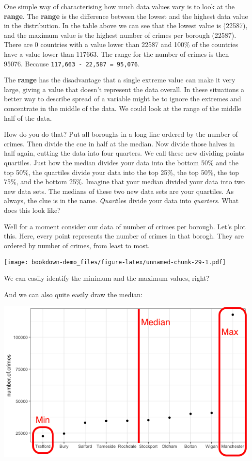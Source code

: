 \documentclass[]{book}
\theoremstyle{definition}
\theoremstyle{definition}
\theoremstyle{definition}
\theoremstyle{remark}
\begin{document}
One simple way of characterising how much data values vary is to look at
the \textbf{range}. The \textbf{range} is the difference between the
lowest and the highest data value in the distribution. In the table
above we can see that the lowest value is (22587), and the maximum value
is the highest number of crimes per borough (22587). There are 0
countries with a value lower than 22587 and 100\% of the countries have
a value lower than 117663. The range for the number of crimes is then
95076. Because \texttt{117,663\ -\ 22,587\ =\ 95,076}.

The \textbf{range} has the disadvantage that a single extreme value can
make it very large, giving a value that doesn't represent the data
overall. In these situations a better way to describe spread of a
variable might be to ignore the extremes and concentrate in the middle
of the data. We could look at the range of the middle half of the data.

How do you do that? Put all boroughs in a long line ordered by the
number of crimes. Then divide the cue in half at the median. Now divide
those halves in half again, cutting the data into four quarters. We call
these new dividing points quartiles. Just how the median divides your
data into the bottom 50\% and the top 50\%, the quartiles divide your
data into the top 25\%, the top 50\%, the top 75\%, and the bottom 25\%.
Imagine that your median divided your data into two new data sets. The
medians of these two new data sets are your quartiles. As always, the
clue is in the name. \emph{Quart}iles divide your data into
\emph{quarters}. What does this look like?

Well for a moment consider our data of number of crimes per borough.
Let's plot this. Here, every point represents the number of crimes in
that borogh. They are ordered by number of crimes, from least to most.

\texttt{[image: bookdown-demo\_files/figure-latex/unnamed-chunk-29-1.pdf]}

We can easily identify the minimum and the maximum values, right?

And we can also quite easily draw the median:

\includegraphics{imgs/crimes_dotplot.png}
\end{document}
